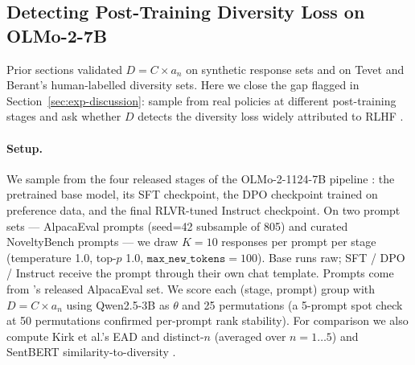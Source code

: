 %
%
%


\subsection{Detecting Post-Training Diversity Loss on OLMo-2-7B}\label{sec:rlhf-experiment}

Prior sections validated $D = C \times a_n$ on synthetic response sets and on Tevet and Berant's human-labelled diversity sets. Here we close the gap flagged in Section~\ref{sec:exp-discussion}: sample from real policies at different post-training stages and ask whether $D$ detects the diversity loss widely attributed to RLHF \citep{kirk2023rlhf,zhang2025verbalizedsampling,padmakumar2023writingreduces}.

\paragraph{Setup.} We sample from the four released stages of the OLMo-2-1124-7B pipeline \citep{olmo2024olmo2}: the pretrained base model, its SFT checkpoint, the DPO checkpoint trained on preference data, and the final RLVR-tuned Instruct checkpoint. On two prompt sets --- \olmoAlpacaN{} AlpacaEval prompts (seed=42 subsample of 805) and \olmoNbCuratedN{} curated NoveltyBench prompts \citep{zhang2025noveltybench} --- we draw $K{=}10$ responses per prompt per stage (temperature 1.0, top-$p$ 1.0, $\texttt{max\_new\_tokens}{=}100$). Base runs raw; SFT / DPO / Instruct receive the prompt through their own chat template. Prompts come from \citet{dubois2024alpacafarm}'s released AlpacaEval set. We score each (stage, prompt) group with $D = C \times a_n$ using Qwen2.5-3B as $\theta$ and 25 permutations (a 5-prompt spot check at 50 permutations confirmed per-prompt rank stability). For comparison we also compute Kirk et al.'s EAD and distinct-$n$ (averaged over $n{=}1\ldots5$) and SentBERT similarity-to-diversity \citep{reimers2019sbert}.

